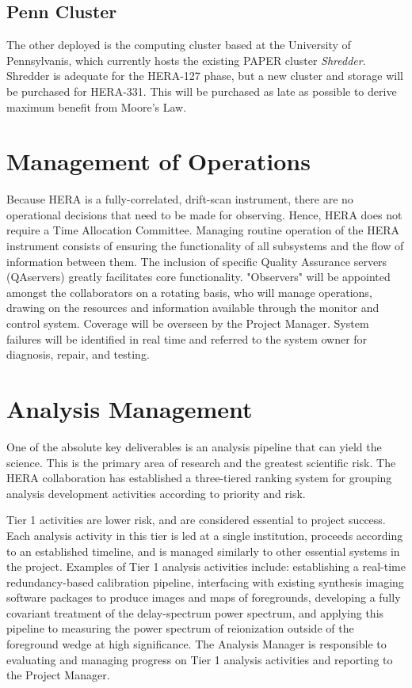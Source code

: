 \documentclass[preprint]{aastex}
\begin{document}
\subsection{Penn Cluster}
The other deployed is the computing cluster based at the University of Pennsylvanis, which currently hosts the existing
PAPER cluster {\em Shredder}.  Shredder is adequate for the HERA-127 phase, but a new cluster and storage will be
purchased for HERA-331.  This will be purchased as late as possible to derive maximum benefit from Moore's Law.

\section{Management of Operations}
\label{sec:operations}

Because HERA is a fully-correlated, drift-scan instrument, there are no operational
decisions that need to be made for observing. Hence, HERA does not require a Time
Allocation Committee. Managing routine operation of the HERA instrument consists of
ensuring the functionality of all subsystems and the flow of information between
them. The inclusion of specific Quality Assurance servers (QAservers) greatly
facilitates core functionality. "Observers" will be appointed amongst the
collaborators on a rotating basis, who will manage operations, drawing on the
resources and information available through the monitor and control system. Coverage
will be overseen by the Project Manager. System failures will be identified in real
time and referred to the system owner for diagnosis, repair, and testing.


\section{Analysis Management}
\label{sec:analysis}

One of the absolute key deliverables is an analysis pipeline that can yield the science.  This is the primary area of
research and the greatest scientific risk.  The HERA collaboration has established
a three-tiered ranking system for grouping analysis development activities according to priority and risk.

Tier 1 activities are lower risk, and are considered essential to project success.  Each analysis activity
in this tier is led at a single institution, proceeds according to an established timeline, and is managed
similarly to other essential systems in the project.  Examples of Tier 1 analysis activities include:
establishing a real-time redundancy-based calibration pipeline, interfacing with existing synthesis imaging
software packages to produce images and maps of foregrounds, developing a fully covariant treatment of
the delay-spectrum power spectrum, and applying this pipeline to measuring the power spectrum of reionization
outside of the foreground wedge at high significance.
The Analysis Manager is responsible to evaluating
and managing progress on Tier 1 analysis activities and reporting to the Project Manager.
\end{document}
